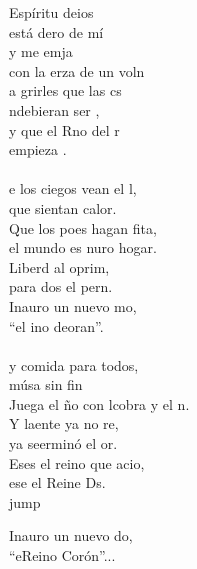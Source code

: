 \begin{cancion}%
	 Espíritu deios\\
	está dero de mí\\
	y me emja\\
	con la erza de un voln\\
	a grirles que las cs\\
	ndebieran ser , \\
	y que el Rno del r\\
	empieza .\\
	\jump\\
	e los ciegos vean el l,\\
	que sientan  calor.\\
	Que los poes hagan fita,\\
	el mundo es nuro hogar.\\
	Liberd al oprim,\\
	para dos el pern.\\
	Inauro un nuevo mo,\\
	“el ino deoran”. \\
	\jump\\
	y comida para todos,\\
	músa sin fin\\
	Juega el ño con lcobra y el n. \\
	Y laente ya no re,\\
	ya seerminó el or.\\
	Eses el reino que acio,\\
	ese  el Reine Ds.\\jump\\
	\begin{chorus}%
	Inauro un nuevo do,\\
	“eReino  Corón”...\\
	\end{chorus}%
	\jump\\
\end{cancion}%
